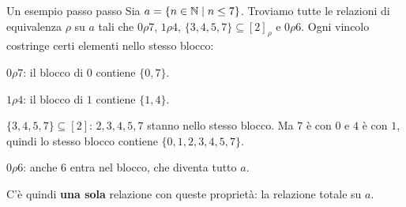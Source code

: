 \begin{esempio}{Un esempio passo passo}
    Sia $a = \{n \in \mathbb{N} \mid n \leq 7\}$. Troviamo tutte le relazioni di equivalenza $\rho$ su $a$ tali che
    $0 \rho 7$, $1 \rho 4$, $\{3, 4, 5, 7\} \subseteq [2]_\rho$ e $0 \rho 6$. Ogni vincolo costringe certi elementi nello stesso blocco:
    \begin{passi}
        \item $0 \rho 7$: il blocco di $0$ contiene $\{0, 7\}$.
        \item $1 \rho 4$: il blocco di $1$ contiene $\{1, 4\}$.
        \item $\{3, 4, 5, 7\} \subseteq [2]$: $2, 3, 4, 5, 7$ stanno nello stesso blocco. Ma $7$ è con $0$ e $4$ è con $1$, quindi
              lo stesso blocco contiene $\{0, 1, 2, 3, 4, 5, 7\}$.
        \item $0 \rho 6$: anche $6$ entra nel blocco, che diventa tutto $a$.
    \end{passi}
    C'è quindi \textbf{una sola} relazione con queste proprietà: la relazione totale su $a$.
\end{esempio}
